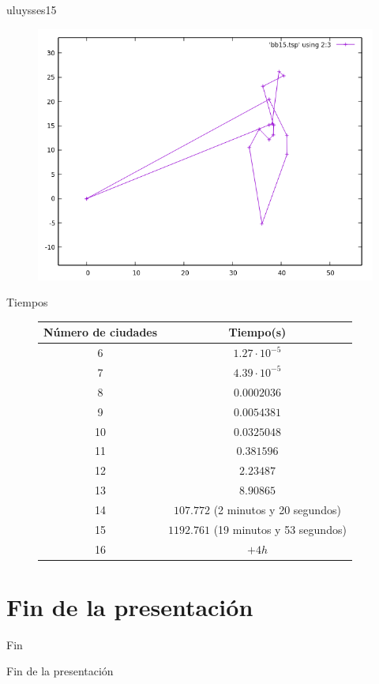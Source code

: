 \documentclass{beamer}
\begin{document}
\begin{frame}[fragile]{uluysses15}
\begin{figure}[H]
\centering
\includegraphics[scale=0.5]{bb15.png}
\end{figure}
\end{frame}

\begin{frame}[fragile]{Tiempos}
\begin{figure}[H]
\centering
\begin{tabular}{|c|c|}
\hline
\textbf{Número de ciudades} & \textbf{Tiempo(s)}\\
\hline
6 & $1.27 \cdot 10^{-5}$\\
\hline
7 & $4.39 \cdot 10^{-5}$\\
\hline
8 & $0.0002036$\\
\hline
9 & $0.0054381$\\
\hline
10 & $0.0325048$\\
\hline
11 & $0.381596$\\
\hline
12 & $2.23487$\\
\hline
13 & $8.90865$\\
\hline
14 & $107.772$ (2 minutos y 20 segundos)\\
\hline
15 & $1192.761$ (19 minutos y 53 segundos)\\
\hline
16 & $+4h$\\
\hline
\end{tabular}
\end{figure}
\end{frame}

\section*{Fin de la presentación}

\begin{frame}{Fin}
\begin{center}
\huge{Fin de la presentación}
\end{center}
\end{frame}
\end{document}
